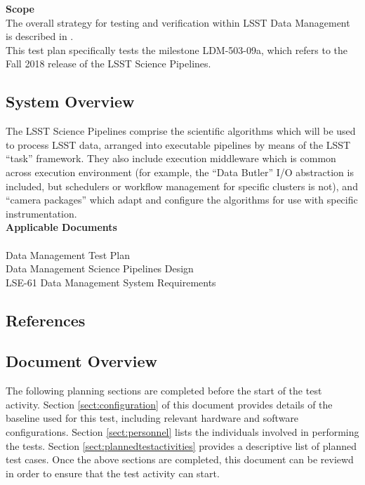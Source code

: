 \documentclass[DM,lsstdraft,STR,toc]{lsstdoc}
\begin{document}
\textbf{Scope}\\[2\baselineskip]The overall strategy for testing and
verification within LSST Data Management is described in .\\
This test plan specifically tests the milestone LDM-503-09a, which
refers to the Fall 2018 release of the LSST Science Pipelines.


\subsection{System Overview}
\label{sect:systemoverview}

The LSST Science Pipelines comprise the scientific algorithms which will
be used to process LSST data, arranged into executable pipelines by
means of the LSST ``task'' framework. They also include execution
middleware which is common across execution environment (for example,
the ``Data Butler'' I/O abstraction is included, but schedulers or
workflow management for specific clusters is not), and ``camera
packages'' which adapt and configure the algorithms for use with
specific instrumentation.\\[2\baselineskip]\textbf{Applicable
Documents\\
}\\
 Data Management Test Plan\\
 Data Management Science Pipelines Design\\
LSE-61 Data Management System Requirements


\subsection{References}
\label{sect:references}

\renewcommand{\refname}{}


\subsection{Document Overview}
\label{sect:docoverview}

The following planning sections are completed before the start of the test activity.
Section \ref{sect:configuration} of this document provides details of the \product{} baseline used for this test, including relevant hardware and software configurations.
Section \ref{sect:personnel} lists the individuals involved in performing the tests.
Section \ref{sect:plannedtestactivities} provides a descriptive list of planned test cases.
Once the above sections are completed, this document can be reviewd in order to ensure that the test activity can start.
\end{document}
